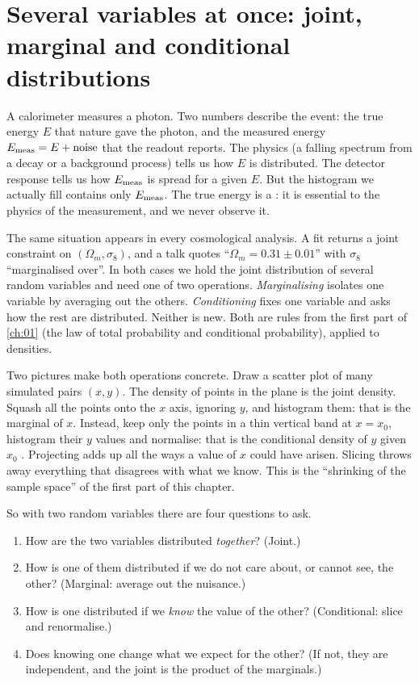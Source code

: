 \section{Several variables at once: joint, marginal and conditional distributions}
\label{1b:sec:joint}

A calorimeter measures a photon. Two numbers describe the event: the true
energy $E$ that nature gave the photon, and the measured energy
$E_{\rm meas}=E+\text{noise}$ that the readout reports. The physics (a falling
spectrum from a decay or a background process) tells us how $E$ is
distributed. The detector response tells us how $E_{\rm meas}$ is spread for
a given $E$. But the histogram we actually fill contains only $E_{\rm meas}$.
The true energy is a : it is essential to the
physics of the measurement, and we never observe it.

The same situation appears in every cosmological analysis. A fit returns a
joint constraint on $(\Omega_m,\sigma_8)$, and a talk quotes
``$\Omega_m=0.31\pm0.01$'' with $\sigma_8$ ``marginalised over''. In both
cases we hold the joint distribution of several random variables and need
one of two operations. \emph{Marginalising} isolates one variable by
averaging out the others. \emph{Conditioning} fixes one variable and asks how
the rest are distributed. Neither is new. Both are rules from the first part
of \cref{ch:01} (the law of total probability and conditional probability),
applied to densities.

Two pictures make both operations concrete. Draw a scatter plot of many simulated pairs $(x,y)$. The density of points in
the plane is the joint density. Squash all the points onto the $x$ axis,
ignoring $y$, and histogram them: that is the marginal of $x$. Instead, keep
only the points in a thin vertical band at $x=x_0$, histogram their $y$
values and normalise: that is the conditional density of $y$ given $x_0$
. Projecting adds up all the ways a value of
$x$ could have arisen. Slicing throws away everything that disagrees with
what we know. This is the ``shrinking of the sample space'' of the first part
of this chapter.

So with two random variables there are four questions to ask.
\begin{enumerate}[leftmargin=1.5em,itemsep=1pt]
  \item How are the two variables distributed \emph{together}? (Joint.)
  \item How is one of them distributed if we do not care about, or cannot
        see, the other? (Marginal: average out the nuisance.)
  \item How is one distributed if we \emph{know} the value of the other?
        (Conditional: slice and renormalise.)
  \item Does knowing one change what we expect for the other? (If not, they
        are independent, and the joint is the product of the marginals.)
\end{enumerate}

